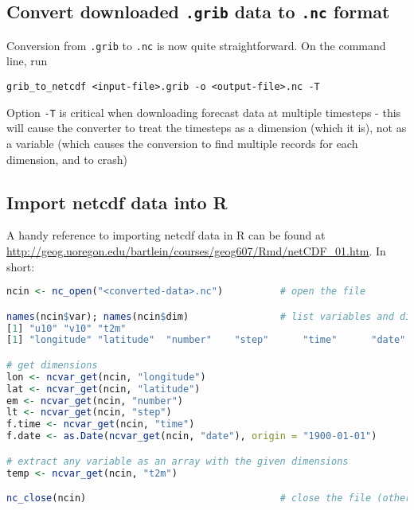 \documentclass[10pt,fleqn]{article}
\begin{document}
\subsection{Convert downloaded \texttt{.grib} data to \texttt{.nc} format}

Conversion from \texttt{.grib} to \texttt{.nc} is now quite straightforward. On the command line, run

\texttt{grib\_to\_netcdf <input-file>.grib -o <output-file>.nc -T}

Option \texttt{-T} is critical when downloading forecast data at multiple timesteps - this will cause the converter to treat the timesteps as a dimension (which it is), not as a variable (which causes the conversion to find multiple records for each dimension, and to crash)

\subsection{Import netcdf data into R}

A handy reference to importing netcdf data in R can be found at \url{http://geog.uoregon.edu/bartlein/courses/geog607/Rmd/netCDF_01.htm}. In short:

\begin{lstlisting}[language=R]
ncin <- nc_open("<converted-data>.nc")			# open the file

names(ncin$var); names(ncin$dim)				# list variables and dimensions
[1] "u10" "v10" "t2m"
[1] "longitude" "latitude"  "number"    "step"      "time"      "date"

# get dimensions
lon <- ncvar_get(ncin, "longitude")         
lat <- ncvar_get(ncin, "latitude")
em <- ncvar_get(ncin, "number")                                         # ensemble members
lt <- ncvar_get(ncin, "step")                                           # time steps (look-ahead time)
f.time <- ncvar_get(ncin, "time")                                       # times that forecast was made
f.date <- as.Date(ncvar_get(ncin, "date"), origin = "1900-01-01")       # dates that forecast was made

# extract any variable as an array with the given dimensions
temp <- ncvar_get(ncin, "t2m")

nc_close(ncin)									# close the file (otherwise it will stay open in your workspace) 
\end{lstlisting}
\end{document}
